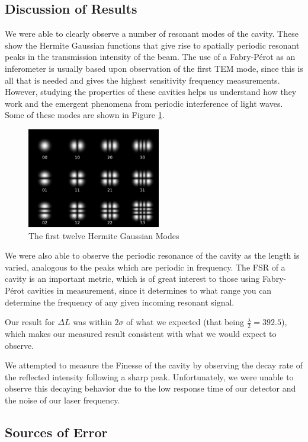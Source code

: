 \documentclass[twocolumn,amsmath,amssymb,pra]{revtex4-2}
\begin{document}
\subsection{Discussion of Results}
We were able to clearly observe a number of resonant modes of the cavity. These show the Hermite Gaussian functions that give rise to spatially periodic resonant peaks in the transmission intensity of the beam. The use of a Fabry-P\'{e}rot as an inferometer is usually based upon observation of the first TEM mode, since this is all that is needed and gives the highest sensitivity frequency measurements. However, studying the properties of these cavities helps us understand how they work and the emergent phenomena from periodic interference of light waves. Some of these modes are shown in Figure \ref{fig:hermite_gaussian}.
\begin{figure}
    \centering
    \includegraphics{Hermite-gaussian.png}
    \caption{The first twelve Hermite Gaussian Modes}
    \label{fig:hermite_gaussian}
\end{figure}
We were also able to observe the periodic resonance of the cavity as the length is varied, analogous to the peaks which are periodic in frequency. The FSR of a cavity is an important metric, which is of great interest to those using Fabry-P\'{e}rot cavities in measurement, since it determines to what range you can determine the frequency of any given incoming resonant signal.

Our result for $\Delta L$ was within $2 \sigma$ of what we expected (that being $\frac{\lambda}{2} = 392.5$), which makes our measured result consistent with what we would expect to observe.



We attempted to measure the Finesse of the cavity by observing the decay rate of the reflected intensity following a sharp peak. Unfortunately, we were unable to observe this decaying behavior due to the low response time of our detector and the noise of our laser frequency. 

\subsection{Sources of Error}
\end{document}
